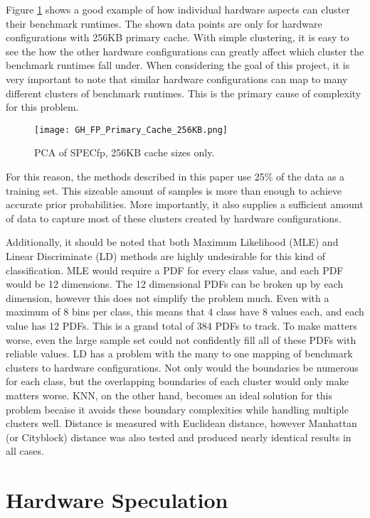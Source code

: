 \documentclass[10pt,twocolumn,letterpaper]{article}
\begin{document}
Figure \ref{fig:fpPrimCache256KB} shows a good example of how individual hardware aspects can cluster their benchmark runtimes.
The shown data points are only for hardware configurations with 256KB primary cache.
With simple clustering, it is easy to see the how the other hardware configurations can greatly affect which cluster the benchmark runtimes fall under.
When considering the goal of this project, it is very important to note that similar hardware configurations can map to many different clusters of benchmark runtimes.
This is the primary cause of complexity for this problem.

\begin{figure}[t]
\centering
\texttt{[image: GH\_FP\_Primary\_Cache\_256KB.png]}
\caption{PCA of SPECfp, 256KB cache sizes only.}
\label{fig:fpPrimCache256KB}
\end{figure}

For this reason, the methods described in this paper use 25\% of the data as a training set.
This sizeable amount of samples is more than enough to achieve accurate prior probabilities.
More importantly, it also supplies a sufficient amount of data to capture most of these clusters created by hardware configurations.

Additionally, it should be noted that both Maximum Likelihood (MLE) and Linear Discriminate (LD) methods are highly undesirable for this kind of classification.
MLE would require a PDF for every class value, and each PDF would be 12 dimensions.
The 12 dimensional PDFs can be broken up by each dimension, however this does not simplify the problem much.
Even with a maximum of 8 bins per class, this means that 4 class have 8 values each, and each value has 12 PDFs.
This is a grand total of 384 PDFs to track.
To make matters worse, even the large sample set could not confidently fill all of these PDFs with reliable values.
LD has a problem with the many to one mapping of benchmark clusters to hardware configurations.
Not only would the boundaries be numerous for each class, but the overlapping boundaries of each cluster would only make matters worse.
KNN, on the other hand, becomes an ideal solution for this problem becaise it avoids these boundary complexities while handling multiple clusters well.
Distance is measured with Euclidean distance, however Manhattan (or Cityblock) distance was also tested and produced nearly identical results in all cases.

\section{Hardware Speculation}
\end{document}
